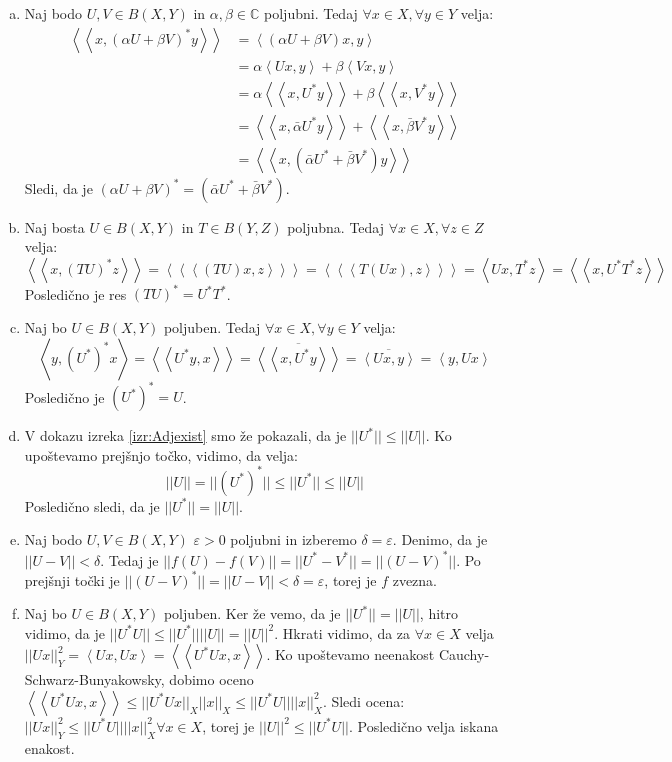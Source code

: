 \documentclass[mat2]{matdelo}
\newcommand{\C}{\mathbb{C}}
\newcommand{\abs}[1]{\ensuremath{\lvert #1 \rvert}}
\newcommand{\norm}[1]{\abs{\abs{#1}}}
\newcommand{\Sp}[2]{\ensuremath{\left<#1, #2\right>}}
\newcommand{\Spp}[2]{\ensuremath{\left<\left<#1, #2\right>\right>}}
\newcommand{\Sppp}[2]{\ensuremath{\left<\left<\left<#1, #2\right>\right>\right>}}
\begin{document}
			\begin{dokaz}
				\begin{enumerate}[a)]
					\item Naj bodo $U, V \in B(X, Y)$ in $\alpha, \beta \in \C$ poljubni. Tedaj $\forall x\in X, \forall y\in Y$ velja: \begin{align*}
						\Spp{x}{(\alpha U + \beta V)^*y} &= \Sp{(\alpha U + \beta V)x}{y} \\
						&= \alpha \Sp{Ux}{y} + \beta \Sp{Vx}{y} \\
						&= \alpha \Spp{x}{U^*y} + \beta\Spp{x}{V^*y} \\
						&= \Spp{x}{\bar{\alpha}U^*y} + \Spp{x}{\bar{\beta}V^*y} \\
						&= \Spp{x}{(\bar{\alpha} U^* + \bar{\beta} V^*)y}
					\end{align*} 
					Sledi, da je $(\alpha U + \beta V)^* = (\bar{\alpha} U^* + \bar{\beta} V^*)$.
					\item Naj bosta $U\in B(X, Y)$ in $T\in B(Y, Z)$ poljubna. Tedaj $\forall x\in X, \forall z\in Z$ velja: $$\Spp{x}{(TU)^*z} = \Sppp{(TU)x}{z} = \Sppp{T(Ux)}{z} = \Sp{Ux}{T^*z} = \Spp{x}{U^*T^*z}$$
					Posledično je res $(TU)^* = U^*T^*$.
					\item Naj bo $U\in B(X, Y)$ poljuben. Tedaj $\forall x\in X, \forall y\in Y$ velja: $$\Sp{y}{(U^*)^*x} = \Spp{U^*y}{x} = \overline{\Spp{x}{U^*y}} = \overline{\Sp{Ux}{y}} = \Sp{y}{Ux}$$
					Posledično je $(U^*)^* = U$.
					\item V dokazu izreka \ref{izr:Adjexist} smo že pokazali, da je $\norm{U^*} \leq \norm{U}$. Ko upoštevamo prejšnjo točko, vidimo, da velja: $$\norm{U} = \norm{(U^*)^*} \leq \norm{U^*} \leq \norm{U}$$
					Posledično sledi, da je $\norm{U^*} = \norm{U}$.
					\item Naj bodo $U, V \in B(X, Y)$ $\varepsilon > 0$ poljubni in izberemo $\delta = \varepsilon$. Denimo, da je $\norm{U - V} < \delta$. Tedaj je $\norm{f(U) - f(V)} = \norm{U^* - V^*} = \norm{(U - V)^*}$. Po prejšnji točki je $\norm{(U-V)^*} = \norm{U - V} < \delta = \varepsilon$, torej je $f$ zvezna.
					\item Naj bo $U\in B(X, Y)$ poljuben. Ker že vemo, da je $\norm{U^*} = \norm{U}$, hitro vidimo, da je $\norm{U^*U}\leq\norm{U^*}\norm{U} = \norm{U}^2$.
					Hkrati vidimo, da za $\forall x\in X$ velja $\norm{Ux}_Y^2 = \Sp{Ux}{Ux} = \Spp{U^*Ux}{x}$. Ko upoštevamo neenakost Cauchy-Schwarz-Bunyakowsky, dobimo oceno $\Spp{U^*Ux}{x} \leq \norm{U^*Ux}_X\norm{x}_X \leq \norm{U^*U}\norm{x}_X^2$. Sledi ocena: $\norm{Ux}_Y^2 \leq \norm{U^*U}\norm{x}_X^2 \forall x\in X$, torej je $\norm{U}^2 \leq \norm{U^* U}$. Posledično velja iskana enakost.
				\end{enumerate}
			\end{dokaz}
			
\end{document}
